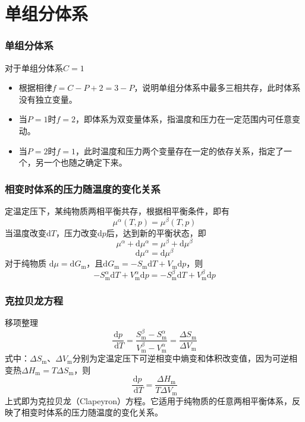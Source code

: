 \section{单组分体系}


\begin{frame}
    \frametitle{单组分体系}

    \large 对于单组分体系$C=1$
    
    \begin{itemize}
        \item[\bullet] 根据相律$f=C-P+2=3-P$，说明单组分体系中最多三相共存，此时体系没有独立变量。
        \item[\bullet] 当$P=1$时$f=2$，即体系为双变量体系，指温度和压力在一定范围内可任意变动。
        \item[\bullet] 当$P=2$时$f=1$，此时温度和压力两个变量存在一定的依存关系，指定了一个，另一个也随之确定下来。
    \end{itemize}

\end{frame}


\begin{frame}
    \frametitle{相变时体系的压力随温度的变化关系}

    \large 定温定压下，某纯物质两相平衡共存，根据相平衡条件，即有
    $$\mu^{\alpha}(T, p)=\mu^{\beta}(T, p)$$
    当温度改变d$T$，压力改变d$p$后，达到新的平衡状态，即
    $$\mu^{\alpha} + \mathrm{d}\mu^{\alpha} =\mu^{\beta} + \mathrm{d}\mu^{\beta}$$
    $$\mathrm{d}\mu^{\alpha} =\mathrm{d}\mu^{\beta}$$
    对于纯物质 $\mathrm{d}\mu = \mathrm{d}G_\mathrm{m}$，且$\mathrm{d} G_{\mathrm{m}}=-S_{\mathrm{m}} \mathrm{d} T+V_{\mathrm{m}} \mathrm{d} p$，则
    $$-S_{\mathrm{m}}^{\alpha} \mathrm{d} T+V_{\mathrm{m}}^{\alpha} \mathrm{d} p=-S_{\mathrm{m}}^{\beta} \mathrm{d} T+V_{\mathrm{m}}^{\beta} \mathrm{d} p$$
\end{frame}


\begin{frame}
    \frametitle{克拉贝龙方程}

    \large 移项整理
    $$\frac{\mathrm{d} p}{\mathrm{~d} T}=\frac{S_{\mathrm{m}}^{\beta}-S_{\mathrm{m}}^{\alpha}}{V_{\mathrm{m}}^{\beta}-V_{\mathrm{m}}^{\alpha}}=\frac{\Delta S_{\mathrm{m}}}{\Delta V_{\mathrm{m}}}$$
    式中：$\Delta S_\mathrm{m}$、$\Delta V_\mathrm{m}$分别为定温定压下可逆相变中熵变和体积改变值，因为可逆相变热$\Delta H_\mathrm{m} = T\Delta S_\mathrm{m}$，则
    $$\frac{\mathrm{d} p}{\mathrm{~d} T}=\frac{\Delta H_\mathrm{m}}{T\Delta V_\mathrm{m}}$$
    上式即为克拉贝龙（Clapeyron）方程。它适用于纯物质的任意两相平衡体系，反映了相变时体系的压力随温度的变化关系。

\end{frame}


